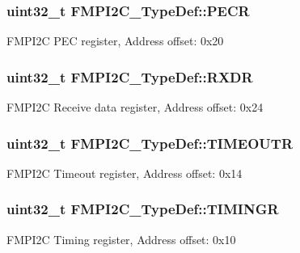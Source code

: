 \subsubsection[{\texorpdfstring{P\+E\+CR}{PECR}}]{ uint32\+\_\+t F\+M\+P\+I2\+C\+\_\+\+Type\+Def\+::\+P\+E\+CR}\hypertarget{struct_f_m_p_i2_c___type_def_a51b237eef8aba0ac4738ff2f39f109c5}{}\label{struct_f_m_p_i2_c___type_def_a51b237eef8aba0ac4738ff2f39f109c5}
F\+M\+P\+I2C P\+EC register, Address offset\+: 0x20 
\subsubsection[{\texorpdfstring{R\+X\+DR}{RXDR}}]{ uint32\+\_\+t F\+M\+P\+I2\+C\+\_\+\+Type\+Def\+::\+R\+X\+DR}\hypertarget{struct_f_m_p_i2_c___type_def_a559de98a04feb3ea2b4770f1f7fab3f5}{}\label{struct_f_m_p_i2_c___type_def_a559de98a04feb3ea2b4770f1f7fab3f5}
F\+M\+P\+I2C Receive data register, Address offset\+: 0x24 
\subsubsection[{\texorpdfstring{T\+I\+M\+E\+O\+U\+TR}{TIMEOUTR}}]{ uint32\+\_\+t F\+M\+P\+I2\+C\+\_\+\+Type\+Def\+::\+T\+I\+M\+E\+O\+U\+TR}\hypertarget{struct_f_m_p_i2_c___type_def_a32077009469569f88bb1858c242b571b}{}\label{struct_f_m_p_i2_c___type_def_a32077009469569f88bb1858c242b571b}
F\+M\+P\+I2C Timeout register, Address offset\+: 0x14 
\subsubsection[{\texorpdfstring{T\+I\+M\+I\+N\+GR}{TIMINGR}}]{ uint32\+\_\+t F\+M\+P\+I2\+C\+\_\+\+Type\+Def\+::\+T\+I\+M\+I\+N\+GR}\hypertarget{struct_f_m_p_i2_c___type_def_a63e23e589c78e9931cb75dab1d4f5d7a}{}\label{struct_f_m_p_i2_c___type_def_a63e23e589c78e9931cb75dab1d4f5d7a}
F\+M\+P\+I2C Timing register, Address offset\+: 0x10 
